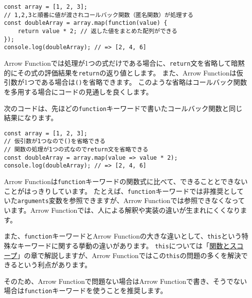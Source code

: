 \begin{lstlisting}
const array = [1, 2, 3];
// 1,2,3と順番に値が渡されコールバック関数（匿名関数）が処理する
const doubleArray = array.map(function(value) {
    return value * 2; // 返した値をまとめた配列ができる
});
console.log(doubleArray); // => [2, 4, 6]
\end{lstlisting}

Arrow
Functionでは処理が1つの式だけである場合に、\texttt{return}文を省略して暗黙的にその式の評価結果を\texttt{return}の返り値とします。
また、Arrow
Functionは仮引数が1つである場合は\texttt{()}を省略できます。
このような省略はコールバック関数を多用する場合にコードの見通しを良くします。

次のコードは、先ほどの\texttt{function}キーワードで書いたコールバック関数と同じ結果になります。

\begin{lstlisting}
const array = [1, 2, 3];
// 仮引数が1つなので()を省略できる
// 関数の処理が1つの式なのでreturn文を省略できる
const doubleArray = array.map(value => value * 2);
console.log(doubleArray); // => [2, 4, 6]
\end{lstlisting}

Arrow
Functionは\texttt{function}キーワードの関数式に比べて、できることとできないことがはっきりしています。
たとえば、\texttt{function}キーワードでは非推奨としていた\texttt{arguments}変数を参照できますが、Arrow
Functionでは参照できなくなっています。Arrow
Functionでは、人による解釈や実装の違いが生まれにくくなります。

また、\texttt{function}キーワードとArrow
Functionの大きな違いとして、\texttt{this}という特殊なキーワードに関する挙動の違いがあります。
\texttt{this}については「\hyperlink{function-and-scope}{関数とスコープ}」の章で解説しますが、Arrow
Functionではこの\texttt{this}の問題の多くを解決できるという利点があります。

そのため、Arrow Functionで問題ない場合はArrow
Functionで書き、そうでない場合は\texttt{function}キーワードを使うことを推奨します。

